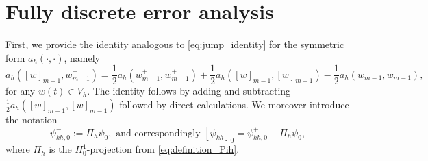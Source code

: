 \documentclass{m2an}
\newcommand{\1}{\mathds{1}}
\theoremstyle{definition}
\begin{document}
\section{Fully discrete error analysis}\label{sec:error_analysis}
First, we provide  the identity analogous to \eqref{eq:jump_identity} for the symmetric form
$a_h(\cdot, \cdot)$, namely
\begin{equation}\label{eq:jump_identity ah}
a_h([w]_{m-1}, w_{m-1}^+)=\frac{1}{2}a_h(w^+_{m-1}, w_{m-1}^+)+\frac{1}{2}a_h([w]_{m-1}, [w]_{m-1})-\frac{1}{2}a_h(w_{m-1}^-, w_{m-1}^-),
\end{equation}
for any $w(t)\in V_h$. The identity follows by adding and subtracting $\frac{1}{2}a_h([w]_{m-1}, [w]_{m-1})$
followed by direct calculations.
We moreover introduce the notation
\begin{equation}\label{eq:jump_at_0_convention}
    \psi_{kh,0}^- := \Pi_h \psi_0, \text{ and correspondingly } [\psi_{kh}]_0 = \psi_{kh,0}^+ - \Pi_h \psi_0,
\end{equation}
where $\Pi_h$ is the $H^1_0$-projection from \eqref{eq:definition_Pih}.
 
\end{document}
